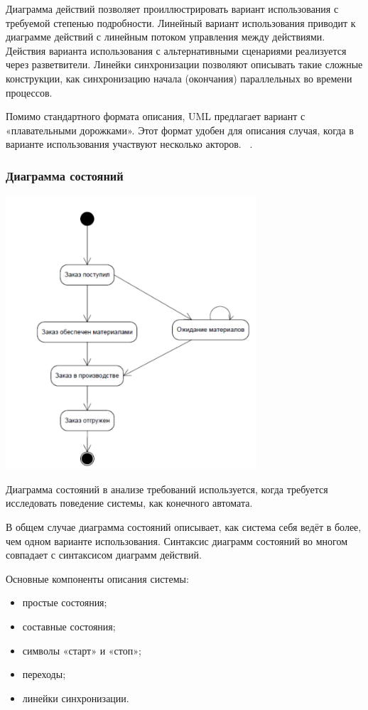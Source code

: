 \documentclass{../industrial-development}
\begin{document}
Диаграмма действий позволяет проиллюстрировать вариант использования с требуемой степенью подробности. Линейный вариант использования приводит к диаграмме действий с линейным потоком управления между действиями. Действия
варианта использования с альтернативными сценариями реализуется через разветвители.
Линейки синхронизации позволяют описывать такие сложные конструкции, как синхронизацию начала (окончания) параллельных во времени процессов.

Помимо стандартного формата описания, UML предлагает вариант с «плавательными дорожками». Этот формат удобен для описания случая, когда в варианте использования участвуют несколько акторов.
~\cite[с.~47-48]{Maglinec}.


\begin{frame} \frametitle {Диаграмма состояний}
 \centerline{\includegraphics[width=0.7\textwidth]{pict6.pdf}}
\end{frame}

\lecturenotes

\alert{Диаграмма состояний} в анализе требований используется, когда требуется
исследовать поведение системы, как конечного автомата. 

В общем случае диаграмма состояний описывает, как система себя ведёт в более,
чем одном варианте использования. Синтаксис диаграмм состояний во многом совпадает
с синтаксисом диаграмм действий.

Основные компоненты описания системы:
\begin{itemize}
\item простые состояния;
\item составные состояния;
\item символы «старт» и «стоп»;
\item переходы;
\item линейки синхронизации.
\end{itemize}
\end{document}

